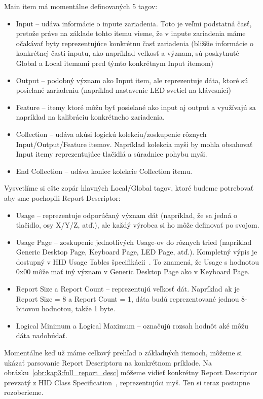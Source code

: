 Main item má momentálne definovaných 5 tagov:
\begin{itemize}
\item Input -- udáva informácie o inpute zariadenia. Toto je veľmi podstatná časť, pretože práve na základe tohto itemu vieme, že v inpute zariadenia máme očakávať byty reprezentujúce konkrétnu časť zariadenia (bližšie informácie o konkrétnej časti inputu, ako napríklad veľkosť a význam, sú poskytnuté Global a Local itemami pred týmto konkrétnym Input itemom)
\item Output -- podobný význam ako Input item, ale reprezentuje dáta, ktoré sú posielané zariadeniu (napríklad nastavenie LED svetiel na klávesnici)
\item Feature -- itemy ktoré môžu byť posielané ako input aj output a využívajú sa napríklad na kalibráciu konkrétneho zariadenia.
\item Collection -- udáva akúsi logickú kolekciu/zoskupenie rôznych Input/Output/Feature itemov. Napríklad kolekcia myši by mohla obsahovať Input itemy reprezentujúce tlačidlá a súradnice pohybu myši.
\item End Collection -- udáva koniec kolekcie Collection itemu.
\end{itemize}

Vysvetlíme si ešte zopár hlavných Local/Global tagov, ktoré budeme potrebovať aby sme pochopili Report Descriptor:
\begin{itemize}
\item Usage -- reprezentuje odporúčaný význam dát (napríklad, že sa jedná o tlačidlo, osy X/Y/Z, atď.), ale každý výrobca si ho môže definovať po svojom.
\item Usage Page -- zoskupenie jednotlivých Usage-ov do rôznych tried (napríklad Generic Desktop Page, Keyboard Page, LED Page, atď.). Kompletný výpis je dostupný v HID Usage Tables špecifikácii~\cite{usage_pages}. To znamená, že Usage s hodnotou 0x00 môže mať iný význam v Generic Desktop Page ako v Keyboard Page.
\item Report Size a Report Count -- reprezentujú veľkosť dát. Napríklad ak je Report Size = 8 a Report Count = 1, dáta budú reprezentované jednou 8-bitovou hodnotou, takže 1 byte.
\item Logical Minimum a Logical Maximum -- označujú rozsah hodnôt aké môžu dáta nadobúdať.
\end{itemize}

Momentálne keď už máme celkový prehľad o základných itemoch, môžeme si ukázať parsovanie Report Descriptoru na konkrétnom príklade. Na obrázku~\ref{obr:kap3:full_report_desc} môžeme vidieť konkrétny Report Descriptor prevzatý z HID Class Specification~\cite{report_desc_mouse}, reprezentujúci myš. Ten si teraz postupne rozoberieme.

